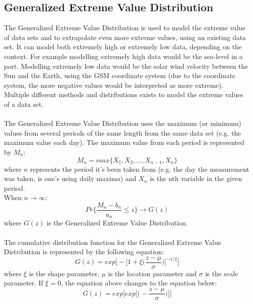 \documentclass[12pt]{article}
\begin{document}
    \subsection{Generalized Extreme Value Distribution}\label{sec:gev}
        The Generalized Extreme Value Distribution is used to model the extreme value of data sets and to extrapolate even more extreme values, using an existing data set. It can model both extremely high or extremely low data, depending on the context. For example modelling extremely high data would be the sea-level in a port. Modelling extremely low data would be the solar wind velocity between the Sun and the Earth, using the GSM coordinate system (due to the coordinate system, the more negative values would be interpreted as more extreme). Multiple different methods and distributions exists to model the extreme values of a data set.\\ \\
        The Generalized Extreme Value Distribution uses the maximum (or minimum) values from several periods of the same length from the same data set (e.g. the maximum value each day). The maximum value from each period is represented by $M_n$:
        \begin{equation}
            M_n = max\{X_1, X_2, ..., X_{n-1}, X_n\}
        \end{equation}
        where $n$ represents the period it's been taken from (e.g. the day the measurement was taken, is one's using daily maxima) and $X_n$ is the nth variable in the given period.\\
        When $n\rightarrow \infty$:
        \begin{equation}
            Pr\Bigg\{ \frac{M_n - b_n}{a_n} \leq z\Bigg\} \rightarrow G(z)
        \end{equation}
        where $G(z)$ is the Generalized Extreme Value Distribution\cite{2001coles}.\\ \\
        The cumulative distribution function for the Generalized Extreme Value Distribution is represented by the following equation\cite{2001coles}:
        \begin{equation}
            G(z) = exp\Bigg [-\Bigg [1+\xi \Bigg (\frac{z-\mu}{\sigma}\Bigg )\Bigg ]^{-1/\xi}\Bigg ]
        \end{equation}
        where $\xi$ is the shape parameter, $\mu$ is the location parameter and $\sigma$ is the scale parameter. If $\xi=0$, the equation above changes to the equation below:
        \begin{equation}
            G(z) = exp\Bigg [exp\Bigg [\Bigg (-\frac{z-\mu}{\sigma}\Bigg )\Bigg ]\Bigg ]
        \end{equation}\\
\end{document}
